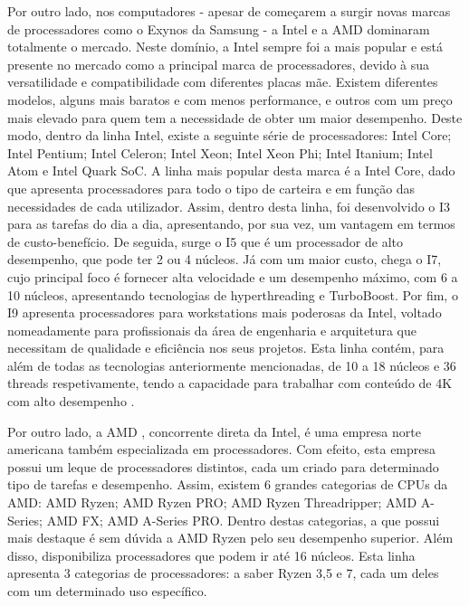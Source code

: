 \documentclass{report}
\begin{document}
Por outro lado, nos computadores - apesar de começarem a surgir novas marcas de processadores como o Exynos da Samsung - a \ac{Intel} e a \ac{AMD} dominaram totalmente o mercado. Neste domínio, a \ac{Intel} sempre foi a mais popular e está presente no mercado como a principal marca de processadores, devido à sua versatilidade e compatibilidade com diferentes placas mãe. Existem diferentes modelos, alguns mais baratos e com menos performance, e outros com um preço mais elevado para quem tem a necessidade de obter um maior desempenho. Deste modo, dentro da linha \ac{Intel}, existe a seguinte série de processadores: \ac{Intel} Core; \ac{Intel} Pentium; \ac{Intel} Celeron; \ac{Intel} Xeon; \ac{Intel} Xeon Phi; \ac{Intel} Itanium; \ac{Intel} Atom e \ac{Intel} Quark SoC\cite{Diferentes2}. A linha mais popular desta marca é a \ac{Intel} Core, dado que apresenta processadores para todo o tipo de carteira e em função das necessidades de cada utilizador. Assim, dentro desta linha, foi desenvolvido o  I3 para as tarefas do dia a dia, apresentando, por sua vez, um vantagem em termos de custo-benefício. De seguida, surge o I5 que é um processador de alto desempenho, que pode ter 2 ou 4 núcleos. Já com um maior custo, chega o I7, cujo principal foco é fornecer alta velocidade e um desempenho máximo, com 6 a 10 núcleos, apresentando tecnologias de hyperthreading e TurboBoost. Por fim, o I9 apresenta processadores para workstations mais poderosas da \ac{Intel}, voltado nomeadamente para profissionais da área de engenharia e arquitetura que necessitam de qualidade e eficiência nos seus projetos. Esta linha contém, para além de todas as tecnologias anteriormente mencionadas, de 10 a 18 núcleos e 36 threads respetivamente, tendo a capacidade para trabalhar com conteúdo de 4K com alto desempenho \cite{Diferentes2}.

Por outro lado, a \ac{AMD} , concorrente direta da \ac{Intel}, é uma empresa norte americana também especializada em processadores. Com efeito, esta empresa possui um leque de processadores distintos, cada um criado para determinado tipo de tarefas e desempenho. Assim, existem 6 grandes categorias de \ac{CPU}s da \ac{AMD}: \ac{AMD} Ryzen; \ac{AMD} Ryzen PRO; \ac{AMD} Ryzen Threadripper; \ac{AMD} A-Series; \ac{AMD} FX; \ac{AMD} A-Series PRO. Dentro destas categorias, a que possui mais destaque é sem dúvida a \ac{AMD} Ryzen pelo seu desempenho superior. Além disso, disponibiliza processadores que podem ir até 16 núcleos. Esta linha apresenta 3 categorias de processadores: a saber Ryzen 3,5 e 7, cada um deles com um determinado uso específico\cite{Diferentes2}.
\end{document}
